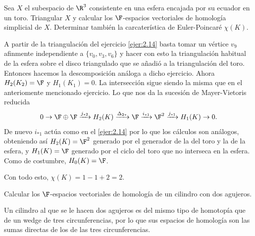 \documentclass[twoside]{article}
\begin{document}
\begin{ejercicio}{2.18}
Sea $X$ el subespacio de $\R^3$
consistente en una esfera encajada por
su ecuador en un toro. Triangular $X$ y calcular los $\F$-espacios vectoriales de homología
simplicial de $X$. Determinar también la carcaterística de Euler-Poincaré $χ(K)$.
\end{ejercicio}
\begin{solucion}
A partir de la triangulación del ejercicio \ref{ejer:2.14} basta tomar un vértice $v_9$ afinmente independiente a $\{v_0,v_3,v_6\}$ y hacer con esto la triangulación habitual de la esfera sobre el disco triangulado que se añadió a la triangulación del toro. Entonces hacemos la descomposición análoga a dicho ejercicio. Ahora $H_2(K_2)=\F$ y $H_1(K_1)=0$. La intersección sigue siendo la misma que en el anteriomente mencionado ejercicio. Lo que nos da la sucesión de Mayer-Vietoris reducida
\[
0\to \F\oplus\F\xrightarrow{j_{*2}}H_2(K)\xrightarrow{\Delta_{2*}}\F\xrightarrow{i_{*1}}\F^2\xrightarrow{j_{*1}}H_1(K)\to 0.
\]
De nuevo $i_{*1}$ actúa como en el \ref{ejer:2.14} por lo que los cálculos son análogos, obteniendo así $H_2(K)=\F^2$ generado por el generador de la del toro y la de la esfera, y $H_1(K)=\F$ generado por el ciclo del toro que no interseca en la esfera. Como de costumbre, $H_0(K)=\F$.

Con todo esto, $\chi(K)=1-1+2=2$.  
\end{solucion}

\newpage

\begin{ejercicio}{2.19}
Calcular los $\F$-espacios vectoriales de homología de un cilindro con dos
agujeros.
\end{ejercicio}
\begin{solucion}
Un cilindro al que se le hacen dos agujeros es del mismo tipo de homotopía que de un wedge de tres circunferencias, por lo que sus espacios de homología son las sumas directas de los de las tres circunferencias. 
\end{solucion}

\newpage
\end{document}
